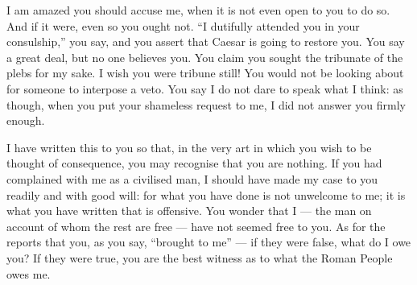 

 I am amazed you should accuse me, when it is not even open to you to do so. And if it were, even so you ought not. ``I dutifully attended you in your consulship,'' you say, and you assert that Caesar is going to restore you. You say a great deal, but no one believes you. You claim you sought the tribunate of the plebs for my sake. I wish you were tribune still! You would not be looking about for someone to interpose a veto. You say I do not dare to speak what I think: as though, when you put your shameless request to me, I did not answer you firmly enough.

 I have written this to you so that, in the very art in which you wish to be thought of consequence, you may recognise that you are nothing. If you had complained with me as a civilised man, I should have made my case to you readily and with good will: for what you have done is not unwelcome to me; it is what you have written that is offensive. You wonder that I --- the man on account of whom the rest are free --- have not seemed free to you. As for the reports that you, as you say, ``brought to me'' --- if they were false, what do I owe you? If they were true, you are the best witness as to what the Roman People owes me.

